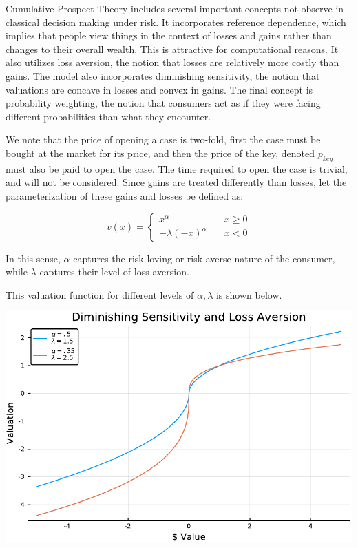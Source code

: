\documentclass[12pt]{paper}
\begin{document}
Cumulative Prospect Theory includes several important concepts not
observe in classical decision making under risk. It incorporates
reference dependence, which implies that people view things in the
context of losses and gains rather than changes to their overall
wealth. This is attractive for computational reasons. It also utilizes
loss aversion, the notion that losses are relatively more costly than
gains. The model also incorporates diminishing sensitivity, the notion
that valuations are concave in losses and convex in gains. The final
concept is probability weighting, the notion that consumers act as if
they were facing different probabilities than what they encounter.

We note that the price of opening a case is two-fold, first the case
must be bought at the market for its price, and then the price of the
key, denoted $p_{key}$ must also be paid to open the case. The time
required to open the case is trivial, and will not be
considered. Since gains are treated differently than losses, let the
parameterization of these gains and losses be defined as:

\begin{equation*}
  v(x) =
  \begin{cases}
    x^\alpha \quad &x \geq 0\\
    -\lambda(-x)^\alpha \quad &x < 0
  \end{cases}
\end{equation*}

In this sense, $\alpha$ captures the risk-loving or risk-averse nature of
the consumer, while $\lambda$ captures their level of loss-aversion.

This valuation function for different levels of $\alpha,\lambda$ is shown below.

\begin{center}
\includegraphics[width=.75\linewidth]{../Plots/ValueFunction.pdf}
\end{center}
\end{document}
